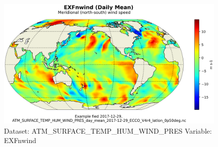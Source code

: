 \begin{figure}[H]
\centering
\includegraphics[scale=0.55]{../images/plots/latlon_plots/Atmosphere_Surface_Temperature_Humidity_Wind_and_Pressure/EXFnwind.png}
\caption{Dataset: ATM\_SURFACE\_TEMP\_HUM\_WIND\_PRES Variable: EXFnwind}
\label{tab:table-ATM_SURFACE_TEMP_HUM_WIND_PRES_EXFnwind-Plot}
\end{figure}
\pagebreak
